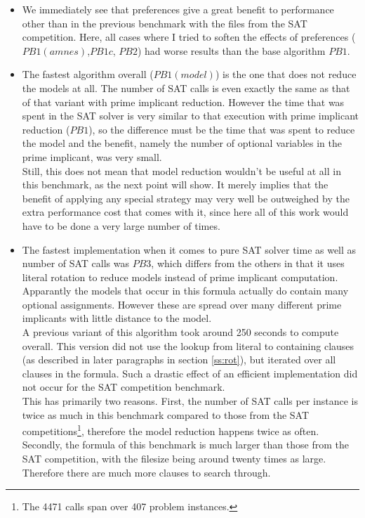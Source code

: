 \begin{itemize}
\item We immediately see that preferences give a great benefit to performance other than in the previous benchmark with the files from the SAT competition. Here, all cases where I tried to soften the effects of preferences ($PB1(amnes)$,$PB1c$, $PB2$) had worse results than the base algorithm $PB1$.
\item The fastest algorithm overall ($PB1(model)$) is the one that does not reduce the models at all. The number of SAT calls is even exactly the same as that of that variant with prime implicant reduction. However the time that was spent in the SAT solver is very similar to that execution with prime implicant reduction ($PB1$), so the difference must be the time that was spent to reduce the model and the benefit, namely the number of optional variables in the prime implicant, was very small.\\
Still, this does not mean that model reduction wouldn't be useful at all in this benchmark, as the next point will show. It merely implies that the benefit of applying any special strategy may very well be outweighed by the extra performance cost that comes with it, since here all of this work would have to be done a very large number of times.
\item The fastest implementation when it comes to pure SAT solver time as well as number of SAT calls was $PB3$, which differs from the others in that it uses literal rotation to reduce models instead of prime implicant computation. Apparantly the models that occur in this formula actually do contain many optional assignments. However these are spread over many different prime implicants with little distance to the model.\\
A previous variant of this algorithm took around 250 seconds to compute overall. This version did not use the lookup from literal to containing clauses (as described in later paragraphs in section \ref{ss:rot}), but iterated over all clauses in the formula. Such a drastic effect of an efficient implementation did not occur for the SAT competition benchmark.\\
This has primarily two reasons. First, the number of SAT calls per instance is twice as much in this benchmark compared to those from the SAT competitions\footnote{The 4471 calls span over 407 problem instances.}, therefore the model reduction happens twice as often. Secondly, the formula of this benchmark is much larger than those from the SAT competition, with the filesize being around twenty times as large. Therefore there are much more clauses to search through.

\end{itemize}
